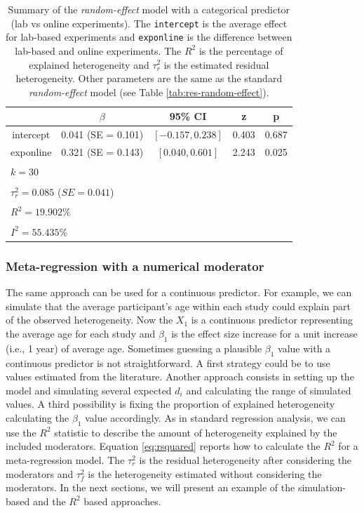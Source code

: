 \documentclass[
  man,floatsintext]{apa6}
\begin{document}
\begin{table}[H]

\caption{\label{tab:res-meta-reg-dummy}Summary of the \emph{random-effect} model with a categorical predictor (lab vs online experiments). The \texttt{intercept} is the average effect for lab-based experiments and \texttt{exponline} is the difference between lab-based and online experiments. The \(R^2\) is the percentage of explained heterogeneity and \(\tau^2_r\) is the estimated residual heterogeneity. Other parameters are the same as the standard \emph{random-effect} model (see Table \ref{tab:res-random-effect}).}
\centering
\fontsize{9}{11}\selectfont
\begin{tabular}[t]{ccccc}
\toprule
 & $\beta$ & 95\% CI & z & p\\
\midrule
intercept & 0.041 (SE = 0.101) & $[-0.157, 0.238]$ & 0.403 & 0.687\\
exponline & 0.321 (SE = 0.143) & $[0.040, 0.601]$ & 2.243 & 0.025\\
\bottomrule
\multicolumn{5}{l}{\textsuperscript{} $k = 30$}\\
\multicolumn{5}{l}{\textsuperscript{} $\tau^2_r = 0.085$ ($SE = 0.041$)}\\
\multicolumn{5}{l}{\textsuperscript{} $R^2 = 19.902\%$}\\
\multicolumn{5}{l}{\textsuperscript{} $I^2 = 55.435\%$}\\
\end{tabular}
\end{table}

\normalsize

\hypertarget{meta-regression-with-a-numerical-moderator}{%
\subsubsection{Meta-regression with a numerical moderator}\label{meta-regression-with-a-numerical-moderator}}

The same approach can be used for a continuous predictor. For example, we can simulate that the average participant's age within each study could explain part of the observed heterogeneity. Now the \(X_1\) is a continuous predictor representing the average age for each study and \(\beta_1\) is the effect size increase for a unit increase (i.e., 1 year) of average age. Sometimes guessing a plausible \(\beta_1\) value with a continuous predictor is not straightforward. A first strategy could be to use values estimated from the literature. Another approach consists in setting up the model and simulating several expected \(d_i\) and calculating the range of simulated values. A third possibility is fixing the proportion of explained heterogeneity calculating the \(\beta_1\) value accordingly. As in standard regression analysis, we can use the \(R^2\) statistic to describe the amount of heterogeneity explained by the included moderators. Equation \eqref{eq:rsquared} reports how to calculate the \(R^2\) for a meta-regression model. The \(\tau^2_{r}\) is the residual heterogeneity after considering the moderators and \(\tau^2_{f}\) is the heterogeneity estimated without considering the moderators. In the next sections, we will present an example of the simulation-based and the \(R^2\) based approaches.
\end{document}
